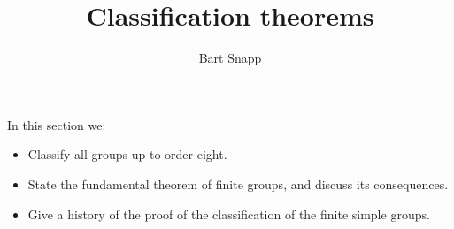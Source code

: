 \documentclass{ximera}
\author{Bart Snapp}
\title{Classification theorems}
\begin{document}
\begin{abstract}
\end{abstract}
\maketitle
In this section we:

\begin{itemize}
\item Classify all groups up to order eight.
\item State the fundamental theorem of finite groups, and discuss its
  consequences.
\item Give a history of the proof of the classification of the finite
  simple groups.
\end{itemize}
\end{document}
